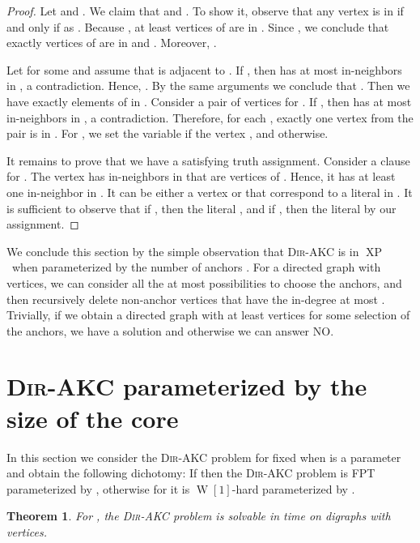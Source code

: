 \documentclass[11pt,a4paper]{article}
\newtheorem{theorem}{Theorem}
\DeclareMathOperator{\operatorClassXP}{XP}
\newcommand{\classXP}{\ensuremath{\operatorClassXP}}
\DeclareMathOperator{\operatorClassW}{W}
\newcommand{\classW}[1]{\ensuremath{\operatorClassW[#1]}}
\newcommand{\DAKC}{\textsc{Dir-AKC}\xspace}
\begin{document}
\begin{proof}
Let  and
. 
 We claim that
 and . To show it, observe that any vertex  is in  if and only if  as
. Because , at least  vertices of  are in . Since , we conclude that
exactly  vertices of  are in  and . Moreover, .

Let  for some  and assume that  is adjacent to . If , then  has
at most  in-neighbors in , a contradiction. Hence, . By the same arguments we
conclude that . Then we have exactly  elements of  in
. Consider a pair of vertices  for . If
, then  has at most  in-neighbors in , a contradiction. Therefore, for each
, exactly one vertex from the pair   is in . For , we set the
variable  if the vertex , and  otherwise.

It remains to prove that we have a satisfying truth assignment. Consider a clause  for . The vertex
 has  in-neighbors in  that are vertices of . Hence, it has at least one in-neighbor in . It can be
either a vertex  or  that correspond to a literal in . It is sufficient to observe that if , then the literal , and if  , then the literal  by our
assignment.
\end{proof}


We conclude this section by the simple observation that \DAKC is in \classXP\ when parameterized by the number of anchors .
For a directed graph  with  vertices, we can consider all the at most  possibilities to
choose the anchors, and then recursively delete non-anchor vertices that have the in-degree at most . Trivially, if we
obtain a directed graph with at least  vertices for some selection of the anchors, we have a solution and otherwise we can
answer NO.

\section{\DAKC parameterized by the size of the core}
\label{sec:saved}
\vskip-2mm
In this section we consider the \DAKC problem for fixed  when  is a parameter and obtain the following dichotomy: If
 then the \DAKC problem is FPT parameterized by , otherwise for  it is \classW1-hard parameterized by .

\begin{theorem}\label{thm:fpt-d-1}
For , the \DAKC problem is solvable in time  on digraphs with  vertices.
\end{theorem}
\end{document}
